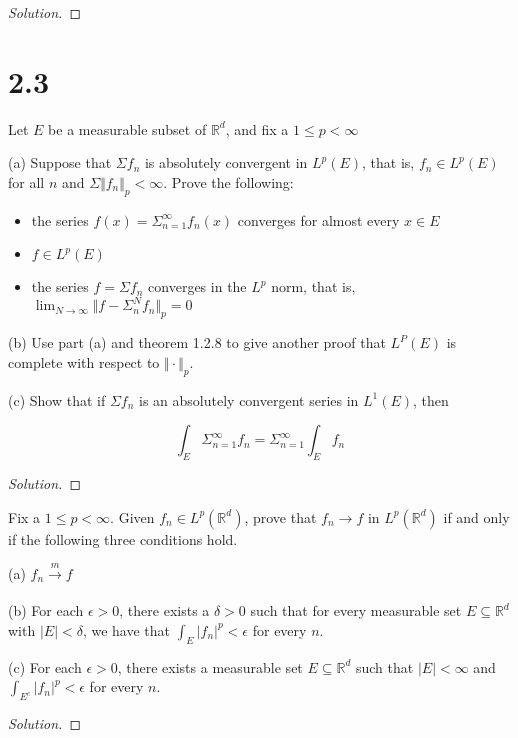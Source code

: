 \documentclass[10pt]{article}
\newenvironment{problem}[2][Problem]{\begin{trivlist}
\item[\hskip \labelsep {\bfseries #1}\hskip \labelsep {\bfseries #2.}]}{\end{trivlist}}
\begin{document}
\begin{proof}[Solution]


\end{proof}

\section*{2.3}

\begin{problem}{7.3.22}

Let $E$ be a measurable subset of $\mathbb{R}^d$, and fix a $1 \leq p < \infty$

(a) Suppose that $\Sigma f_n$ is absolutely convergent in $L^p(E)$, that is, $f_n \in L^p(E)$ for all $n$ and $\Sigma \Vert f_n \Vert_p < \infty$. Prove the following:

\begin{itemize}
\item the series $f(x) = \Sigma_{n=1}^\infty f_n(x)$ converges for almost every $x \in E$ \\
\item $f \in L^p(E)$\\
\item the series $f = \Sigma f_n$ converges in the $L^p$ norm, that is, $\lim_{N \to \infty} \Vert f - \Sigma_n^N f_n \Vert_p = 0$
\end{itemize}

(b) Use part (a) and theorem 1.2.8 to give another proof that $L^P(E)$ is complete with respect to $\Vert \cdot \Vert_p$.

(c) Show that if $\Sigma f_n$ is an absolutely convergent series in $L^1(E)$, then

$$\int_E \Sigma_{n=1}^\infty f_n = \Sigma_{n=1}^\infty \int_E f_n $$


\end{problem}
\begin{proof}[Solution]

\end{proof}


\begin{problem}{7.3.23}

Fix a $1 \leq p < \infty$. Given $f_n \in L^p(\mathbb{R}^d)$, prove that $f_n \to f$ in $L^p(\mathbb{R}^d)$ if and only if the following three conditions hold.

(a) $f_n \xrightarrow[]{m} f$

(b) For each $\epsilon > 0$, there exists a $\delta > 0$ such that for every measurable set $E \subseteq \mathbb{R}^d$ with $|E| < \delta$, we have that $\int_E |f_n|^p < \epsilon$ for every $n$.

(c) For each $\epsilon > 0$, there exists a measurable set $E \subseteq \mathbb{R}^d$ such that $|E| < \infty$ and $ \int_{E^c} |f_n|^p < \epsilon$ for every $n$.

\end{problem}
\begin{proof}[Solution]

\end{proof}

 
\end{document}
